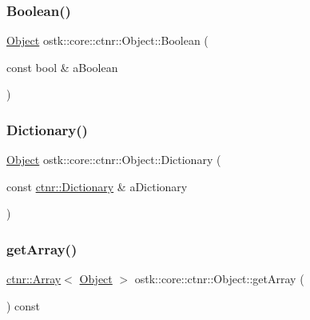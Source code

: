 \mbox{\label{classostk_1_1core_1_1ctnr_1_1_object_a5d597388926deba203fdb9b23f309201}} 
\subsubsection{\texorpdfstring{Boolean()}{Boolean()}}
{\footnotesize\ttfamily \hyperlink{classostk_1_1core_1_1ctnr_1_1_object}{Object} ostk\+::core\+::ctnr\+::\+Object\+::\+Boolean (\begin{DoxyParamCaption}\item[{const bool \&}]{a\+Boolean }\end{DoxyParamCaption})\hspace{0.3cm}{\ttfamily [static]}}

\mbox{\label{classostk_1_1core_1_1ctnr_1_1_object_aa8ed140c1451debf5ceb71667019f7be}} 
\subsubsection{\texorpdfstring{Dictionary()}{Dictionary()}}
{\footnotesize\ttfamily \hyperlink{classostk_1_1core_1_1ctnr_1_1_object}{Object} ostk\+::core\+::ctnr\+::\+Object\+::\+Dictionary (\begin{DoxyParamCaption}\item[{const \hyperlink{classostk_1_1core_1_1ctnr_1_1_dictionary}{ctnr\+::\+Dictionary} \&}]{a\+Dictionary }\end{DoxyParamCaption})\hspace{0.3cm}{\ttfamily [static]}}

\mbox{\label{classostk_1_1core_1_1ctnr_1_1_object_a684b133f2c07d1e73642e3a2911da95a}} 
\subsubsection{\texorpdfstring{get\+Array()}{getArray()}}
{\footnotesize\ttfamily \hyperlink{classostk_1_1core_1_1ctnr_1_1_array}{ctnr\+::\+Array}$<$ \hyperlink{classostk_1_1core_1_1ctnr_1_1_object}{Object} $>$ ostk\+::core\+::ctnr\+::\+Object\+::get\+Array (\begin{DoxyParamCaption}{ }\end{DoxyParamCaption}) const}

